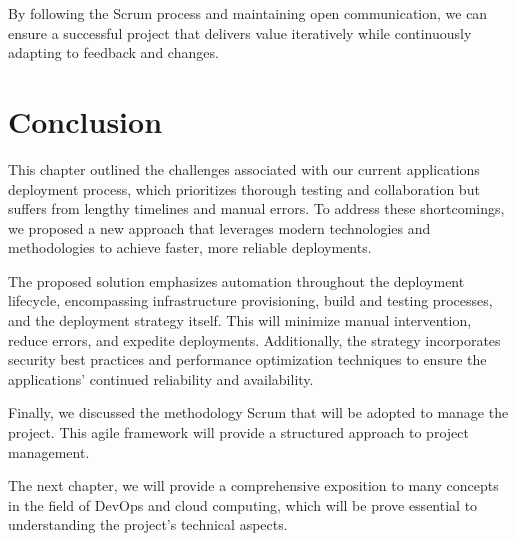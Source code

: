 By following the Scrum process and maintaining open communication, we can ensure a successful project that delivers value iteratively while continuously adapting to feedback and changes.

\section*{Conclusion}
This chapter outlined the challenges associated with our current applications deployment process, which prioritizes thorough testing and collaboration but suffers from lengthy timelines and manual errors. To address these shortcomings, we proposed a new approach that leverages modern technologies and methodologies to achieve faster, more reliable deployments.
\par
The proposed solution emphasizes automation throughout the deployment lifecycle, encompassing infrastructure provisioning, build and testing processes, and the deployment strategy itself. This will minimize manual intervention, reduce errors, and expedite deployments. Additionally, the strategy incorporates security best practices and performance optimization techniques to ensure the applications' continued reliability and availability.
\par 
Finally, we discussed the methodology Scrum that will be adopted to manage the project. This agile framework will provide a structured approach to project management.
\par
The next chapter, we will provide a comprehensive exposition to many concepts in the field of DevOps and cloud computing, which will be prove essential to understanding the project's technical aspects.